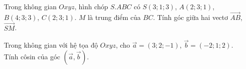 \begin{bt}%
	Trong không gian $Oxyz$, hình chóp $S.ABC$ có $S(3;1;3)$, $A(2;3;1)$, $B(4;3;3)$, $C(2;3;1)$. $M$ là trung điểm của $BC$. Tính góc giữa hai vectơ $\overrightarrow{AB}$, $\overrightarrow{SM}$.
\end{bt}

\begin{bt}%
	Trong không gian với hệ tọa độ $Oxyz$, cho $\overrightarrow{a}=(3;2;-1)$, $\overrightarrow{b}=(-2;1;2)$. Tính côsin của góc $(\overrightarrow{a},\overrightarrow{b})$.
\end{bt}

